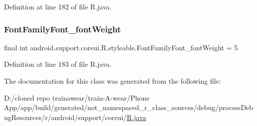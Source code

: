 Definition at line 182 of file R.\+java.

\mbox{\label{classandroid_1_1support_1_1coreui_1_1_r_1_1styleable_ab902fae1b15d37a55f927de5a8914a7e}} 
\subsubsection{\texorpdfstring{FontFamilyFont\_fontWeight}{FontFamilyFont\_fontWeight}}
{\footnotesize\ttfamily final int android.\+support.\+coreui.\+R.\+styleable.\+Font\+Family\+Font\+\_\+font\+Weight = 5\hspace{0.3cm}{\ttfamily [static]}}



Definition at line 183 of file R.\+java.



The documentation for this class was generated from the following file\+:\begin{DoxyCompactItemize}
\item 
D\+:/cloned repo trainawear/train-\/\+A-\/wear/\+Phone App/app/build/generated/not\+\_\+namespaced\+\_\+r\+\_\+class\+\_\+sources/debug/process\+Debug\+Resources/r/android/support/coreui/\mbox{\hyperlink{process_debug_resources_2r_2android_2support_2coreui_2_r_8java}{R.\+java}}\end{DoxyCompactItemize}
